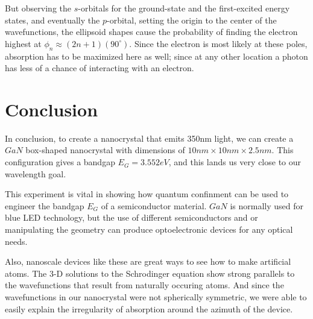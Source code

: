 \documentclass{IEEEtran}
\begin{document}
But observing the \(s\)-orbitals for the ground-state and the first-excited energy states, and eventually the \(p\)-orbital, setting the origin to the center of the wavefunctions, the ellipsoid shapes cause the probability of finding the electron highest at \(\phi_n \approx (2n+1)(90^\circ)\). Since the electron is most likely at these poles, absorption has to be maximized here as well; since at any other location a photon has less of a chance of interacting with an electron. 

\section{Conclusion}

In conclusion, to create a nanocrystal that emits 350nm light, we can create a \(GaN\) box-shaped nanocrystal with dimensions of \(10nm \times 10nm \times 2.5nm\). This configuration gives a bandgap \(E_G = 3.552eV\), and this lands us very close to our wavelength goal. 

This experiment is vital in showing how quantum confinment can be used to engineer the bandgap \(E_G\) of a semiconductor material. \(GaN\)  is normally used for blue LED technology, but the use of different semiconductors and or manipulating the geometry can produce optoelectronic devices for any optical needs. 

Also, nanoscale devices like these are great ways to see how to make artificial atoms. The 3-D solutions to the Schrodinger equation show strong parallels to the wavefunctions that result from naturally occuring atoms. And since the wavefunctions in our nanocrystal were not spherically symmetric, we were able to easily explain the irregularity of absorption around the azimuth of the device.



\end{document}
